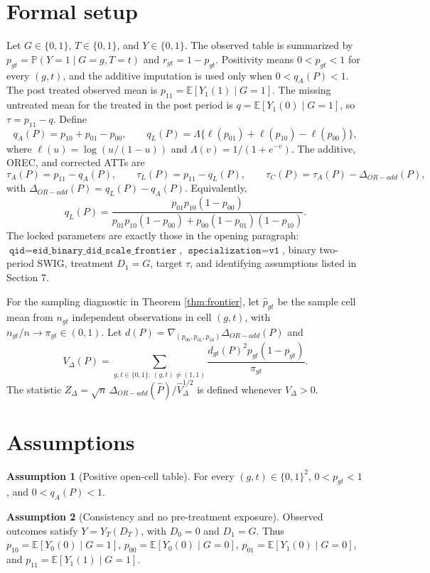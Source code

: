 \documentclass[11pt]{article}
\newcommand{\E}{\mathbb{E}}
\renewcommand{\Pr}{\mathbb{P}}
\theoremstyle{definition}
\newtheorem{assumption}{Assumption}
\theoremstyle{plain}
\theoremstyle{remark}
\begin{document}
\section{Formal setup}
Let \(G\in\{0,1\}\), \(T\in\{0,1\}\), and \(Y\in\{0,1\}\).  The observed table is summarized by \(p_{gt}=\Pr(Y=1\mid G=g,T=t)\) and \(r_{gt}=1-p_{gt}\).  Positivity means \(0<p_{gt}<1\) for every \((g,t)\), and the additive imputation is used only when \(0<q_A(P)<1\).  The post treated observed mean is \(p_{11}=\E[Y_1(1)\mid G=1]\).  The missing untreated mean for the treated in the post period is \(q=\E[Y_1(0)\mid G=1]\), so \(\tau=p_{11}-q\).  Define
\[
q_A(P)=p_{10}+p_{01}-p_{00},\qquad
q_L(P)=\Lambda\{\ell(p_{01})+\ell(p_{10})-\ell(p_{00})\},
\]
where \(\ell(u)=\log(u/(1-u))\) and \(\Lambda(v)=1/(1+e^{-v})\).  The additive, OREC, and corrected ATTs are
\[
\tau_A(P)=p_{11}-q_A(P),\qquad
\tau_L(P)=p_{11}-q_L(P),\qquad
\tau_C(P)=\tau_A(P)-\Delta_{OR-add}(P),
\]
with \(\Delta_{OR-add}(P)=q_L(P)-q_A(P)\).  Equivalently,
\[
q_L(P)=\frac{p_{01}p_{10}(1-p_{00})}{p_{01}p_{10}(1-p_{00})+p_{00}(1-p_{01})(1-p_{10})}.
\]
The locked parameters are exactly those in the opening paragraph: \(\texttt{qid}=\texttt{eid\_binary\_did\_scale\_frontier}\), \(\texttt{specialization}=\texttt{v1}\), binary two-period SWIG, treatment \(D_1=G\), target \(\tau\), and identifying assumptions listed in Section 7.

For the sampling diagnostic in Theorem \ref{thm:frontier}, let \(\widehat p_{gt}\) be the sample cell mean from \(n_{gt}\) independent observations in cell \((g,t)\), with \(n_{gt}/n\to\pi_{gt}\in(0,1)\).  Let \(d(P)=\nabla_{(p_{00},p_{01},p_{10})}\Delta_{OR-add}(P)\) and
\[
V_\Delta(P)=\sum_{g,t\in\{0,1\}:\,(g,t)\neq(1,1)}\frac{d_{gt}(P)^2p_{gt}(1-p_{gt})}{\pi_{gt}}.
\]
The statistic \(Z_\Delta=\sqrt n\,\Delta_{OR-add}(\widehat P)/\widehat V_\Delta^{1/2}\) is defined whenever \(\widehat V_\Delta>0\).

\section{Assumptions}
\begin{assumption}[Positive open-cell table]\label{ass:positive}
For every \((g,t)\in\{0,1\}^2\), \(0<p_{gt}<1\), and \(0<q_A(P)<1\).
\end{assumption}

\begin{assumption}[Consistency and no pre-treatment exposure]\label{ass:consistency}
Observed outcomes satisfy \(Y=Y_T(D_T)\), with \(D_0=0\) and \(D_1=G\).  Thus \(p_{10}=\E[Y_0(0)\mid G=1]\), \(p_{00}=\E[Y_0(0)\mid G=0]\), \(p_{01}=\E[Y_1(0)\mid G=0]\), and \(p_{11}=\E[Y_1(1)\mid G=1]\).
\end{assumption}
\end{document}
